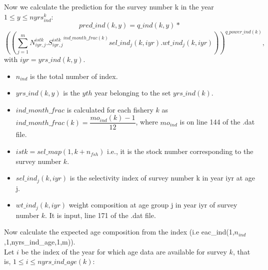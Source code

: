 \documentclass{article}
\begin{document}
Now we calculate the prediction for the survey number k in the year $1\leq y \leq nyrs_{ind}^k$:
\begin{equation}
    pred\_ind(k,y)=q\_ind(k,y)*
\end{equation}
\begin{equation}
    \left(\left(\sum_{j=1}^mN^{istk}_{iyr,j}.{S^{istk}_{iyr,j}}^{ind\_month\_frac(k)}sel\_ind_j(k,iyr).wt\_ind_j(k,iyr)\right)\right)^{q\_power\_ind(k)},
\end{equation}
with $iyr=yrs\_ind(k,y)$.
\begin{itemize}
\item $n_{ind}$ is the total number of index.
\item $yrs\_ind(k,y)$ is the $yth$ year belonging to the set $yrs\_ind(k)$.

    \item $ind\_month\_frac$ is calculated for each fishery $k$ as $ind\_month\_frac(k)=\dfrac{mo_{ind}(k)-1}{12}$, where $mo_{ind}$ is on line 144 of the .dat file.
    \item $istk=sel\_map(1,k+n_{fsh})$ 
i.e., it is the stock number corresponding to the survey number $k$.
    \item $sel\_ind_j(k,iyr)$ 
is the selectivity index of survey number k in year iyr at age j.
    \item $wt\_ind_j(k,iyr)$ 
weight composition at age group j in year iyr of survey number $k$. It is input, line 171 of the .dat file.
    \end{itemize}
    Now calculate the expected age composition from the index (i.e eac\_ind(1,$n_{ind}$,1,nyrs\_ind\_age,1,m)).\\
Let $i$ be the index of the year for which age data are available for survey $k$, that is, $1\leq i \leq nyrs\_ind\_age(k)$:
\end{document}
